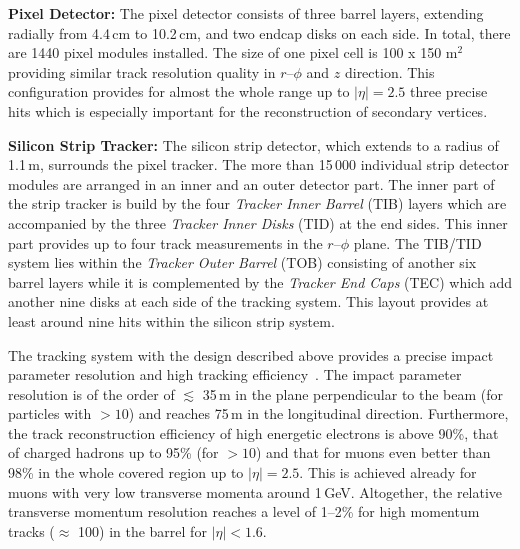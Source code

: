 \begin{description}
 \item \textbf{Pixel Detector:} The pixel detector consists of three barrel layers, extending radially from 4.4\,cm to 10.2\,cm, and two endcap disks on each side. In total, there are 1440 pixel modules installed. The size of one pixel cell is 100 x 150 \textmu m$^2$ providing similar track resolution quality in $r$--$\phi$ and $z$ direction. This configuration provides for almost the whole range up to $|\eta| = 2.5$ three precise hits which is especially important for the reconstruction of secondary vertices.
 \item \textbf{Silicon Strip Tracker:} The silicon strip detector, which extends to a radius of 1.1\,m, surrounds the pixel tracker. The more than 15\,000 individual strip detector modules are arranged in an inner and an outer detector part. The inner part of the strip tracker is build by the four \textit{Tracker Inner Barrel} (TIB) layers which are accompanied by the three \textit{Tracker Inner Disks} (TID) at the end sides. This inner part provides up to four track measurements in the $r$--$\phi$ plane. The TIB/TID system lies within the \textit{Tracker Outer Barrel} (TOB) consisting of another six barrel layers while it is complemented by the \textit{Tracker End Caps} (TEC) which add another nine disks at each side of the tracking system. This layout provides at least around nine hits within the silicon strip system. 
\end{description}
The tracking system with the design described above provides a precise impact parameter resolution and high tracking efficiency~\cite{bib:cmstdr:tracker}. The impact parameter resolution is of the order of $\lesssim$ 35\,\textmu m in the plane perpendicular to the beam (for particles with \pt$> 10$\gev) and reaches 75\,\textmu m in the longitudinal direction. Furthermore, the track reconstruction efficiency of high energetic electrons is above 90\%, that of charged hadrons up to 95\% (for \pt$> 10$\gev) and that for muons even better than 98\% in the whole covered region up to $|\eta| = 2.5$. This is achieved already for muons with very low transverse momenta around 1\,GeV. Altogether, the relative transverse momentum resolution reaches a level of 1--2\% for high momentum tracks ($\approx$ 100\gev) in the barrel for $|\eta| < 1.6$.
 

